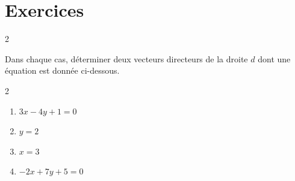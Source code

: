 \newpage
\section{Exercices}
 {
  \small
  \begin{multicols}{2}
	  \begin{exo}{}
		  Dans chaque cas, déterminer deux vecteurs directeurs de la droite $d$ dont une équation est donnée ci-dessous.
		  \vspace*{-2mm}
		  \begin{multicols}{2}
			  \begin{enumerate}
				  \item $3x - 4y + 1 = 0$
				  \item $y = 2$
				  \item $x = 3$
				  \item $-2x + 7y + 5 = 0$
			  \end{enumerate}
		  \end{multicols}
	  \end{exo}

	  \begin{exo}
		  \lipsum
	  \end{exo}
	  \vfill~
  \end{multicols}
 }

